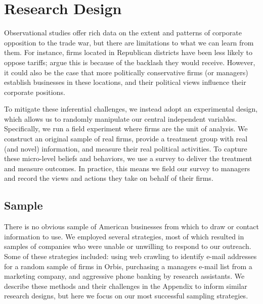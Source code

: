 \documentclass{article}
\begin{document}


\section{Research Design}

Observational studies offer rich data on the extent and patterns of corporate opposition to the trade war, but there are limitations to what we can learn from them. For instance, firms located in Republican districts have been less likely to oppose tariffs; \citet{zhu2021firms} argue this is because of the backlash they would receive. However, it could also be the case that more politically conservative firms (or managers) establish businesses in these locations, and their political views influence their corporate positions.

To mitigate these inferential challenges, we instead adopt an experimental design, which allows us to randomly manipulate our central independent variables. Specifically, we run a field experiment where firms are the unit of analysis. We construct an original sample of real firms, provide a treatment group with real (and novel) information, and measure their real political activities. To capture these micro-level beliefs and behaviors, we use a survey to deliver the treatment and measure outcomes. In practice, this means we field our survey to managers and record the views and actions they take on behalf of their firms.

\subsection{Sample}

There is no obvious sample of American businesses from which to draw or contact information to use. We employed several strategies, most of which resulted in samples of companies who were unable or unwilling to respond to our outreach. Some of these strategies included: using web crawling to identify e-mail addresses for a random sample of firms in Orbis, purchasing a managers e-mail list from a marketing company, and aggressive phone banking by research assistants. We describe these methods and their challenges in the Appendix to inform similar research designs, but here we focus on our most successful sampling strategies.
\end{document}
